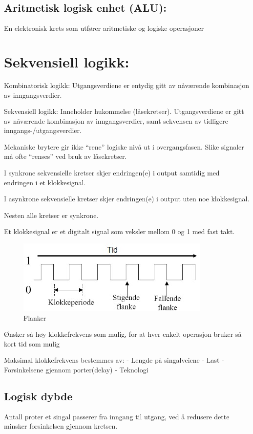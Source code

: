 \documentclass{article}
\begin{document}
	
	\subsection{Aritmetisk logisk enhet (ALU):}
	En elektronisk krets som utfører aritmetiske og logiske operasjoner	
	
	\section{Sekvensiell logikk:}
	
	Kombinatorisk logikk:
	Utgangsverdiene er entydig gitt av nåværende kombinasjon av inngangsverdier.
	
	Sekvensiell logikk:
	Inneholder hukommelse (låsekretser). Utgangsverdiene er gitt av nåværende kombinasjon av inngangsverdier,  samt sekvensen av tidligere inngangs-­/utgangsverdier.
	
	Mekaniske brytere gir ikke “rene”  logiske nivå ut i
	overgangsfasen.  Slike signaler  må ofte “renses”  ved bruk
	av låsekretser.
	
	I synkrone  sekvensielle kretser skjer endringen(e) i output  samtidig  med endringen i et  klokkesignal. 
	 
	I  asynkrone  sekvensielle kretser skjer endringen(e) i  output  uten  noe  klokkesignal.  
	 
	Nesten alle kretser er synkrone.
	 
	Et klokkesignal er et digitalt signal som veksler mellom 0 og 1 med fast takt. 
	
	\begin{figure}[H]
		\includegraphics[scale = 0.6]{flanke.jpg}
		\caption{Flanker}
	\end{figure}
	 
	Ønsker så høy klokkefrekvens som mulig, for at hver enkelt operasjon bruker så kort tid som mulig
	 
	Maksimal klokkefrekvens bestemmes av:
	 - Lengde på singalveiene
	 - Last
	 - Forsinkelsene gjennom porter(delay)
	 - Teknologi
	 
	\subsection{Logisk dybde}
	Antall proter et singal passerer fra inngang til utgang, ved å redusere dette minsker forsinkelsen gjennom kretsen.
	
\end{document}
